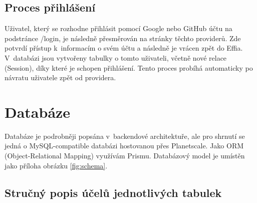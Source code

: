 \documentclass[12pt, a4paper,
openright
]{report}
\begin{document}
\subsection{Proces přihlášení}
Uživatel, který se rozhodne přihlásit pomocí Google nebo GitHub účtu na podstránce /login, je následně přesměrován na stránky těchto providerů. Zde potvrdí přístup k~informacím o svém účtu a následně je vrácen zpět do Effia. V~databázi jsou vytvořeny tabulky o tomto uživateli, včetně nové relace (Session), díky které je schopen přihlášení. Tento proces probíhá automaticky po návratu uživatele zpět od providera.

\clearpage
\section{Databáze}

Databáze je podrobněji popsána v~backendové architektuře, ale pro shrnutí se jedná o MySQL-compatible databázi hostovanou přes Planetscale. Jako ORM (Object-Relational Mapping) využívám Prismu. Databázový model je umístěn jako příloha obrázku \ref{fig:schema}.

\subsection{Stručný popis účelů jednotlivých tabulek}
\end{document}
